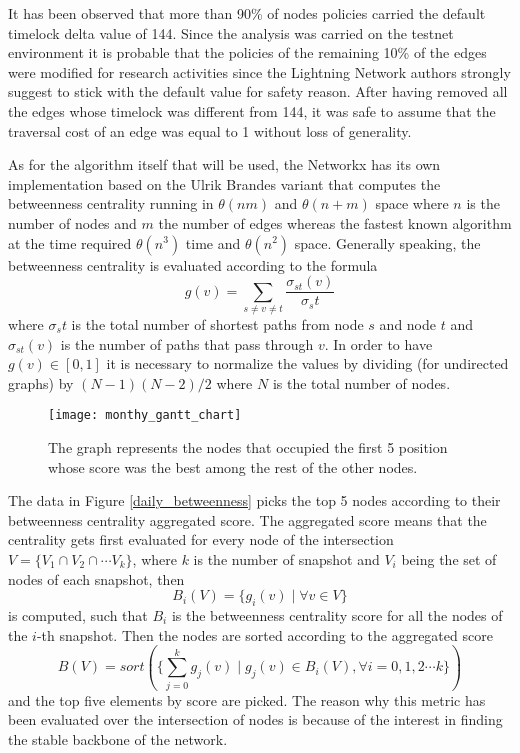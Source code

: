 	It has been observed that more than 90\% of nodes policies carried the default timelock delta value of 144. Since the analysis was carried on the testnet environment it is probable that the policies of the remaining 10\% of the edges were modified for research activities since the Lightning Network authors strongly suggest to stick with the default value for safety reason. After having removed all the edges whose timelock was different from 144, it was safe to assume that the traversal cost of an edge was equal to 1 without loss of generality.
	
	
	As for the algorithm itself that will be used, the Networkx has its own implementation based on the Ulrik Brandes \cite{Brandes2001} variant that computes the betweenness centrality running in $\theta(nm)$ and $\theta(n + m)$ space where $n$ is the number of nodes and $m$ the number of edges whereas the fastest known algorithm at the time required $\theta(n^3)$ time and $\theta(n^2)$ space.	Generally speaking, the betweenness centrality is evaluated according to the formula 
	\begin{equation}
		g(v) = \sum_{s \neq v \neq t}{\frac{\sigma_{st}(v) }{\sigma_st}}
	\end{equation}
	where $\sigma_st$ is the total number of shortest paths from node $s$ and node $t$ and $\sigma_{st}(v)$ is the number of paths that pass through $v$. In order to have $g(v) \in [0, 1]$ it is necessary to normalize the values by dividing (for undirected graphs) by $(N-1)(N-2)/2$ where $N$ is the total number of nodes.
	
	\begin{figure}
		\centering
		\texttt{[image: monthy\_gantt\_chart]}
		\caption{The graph represents the nodes that occupied the first 5 position whose score was the best among the rest of the other nodes.}
		\label{monthly_gantt}
	\end{figure}		
	
	The data in Figure \ref{daily_betweenness} picks the top 5 nodes according to their betweenness centrality aggregated score. The aggregated score means that the centrality gets first evaluated for every node of the intersection $V = \{V_1 \cap V_2 \cap \cdots V_k \}$, where $k$ is the number of snapshot and $V_i$ being the set of nodes of each snapshot, then
	\begin{equation}
		B_i(V) = \{ g_i(v) \mid \forall v \in V \}
	\end{equation}
	is computed, such that $B_i$ is the betweenness centrality score for all the nodes of the $i$-th snapshot. Then the nodes are sorted according to the aggregated score
	\begin{equation}
		B(V) = sort(\{ \sum_{j = 0}^{k}g_j(v) \mid g_j(v) \in B_i(V), \forall i= 0,1,2 \cdots k\})
	\end{equation}
	and the top five elements by score are picked. The reason why this metric has been evaluated over the intersection of nodes is because of the interest in finding the stable backbone of the network.
	
